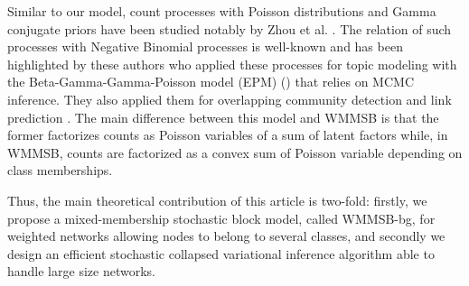 Similar to our model, count processes with Poisson distributions and Gamma conjugate priors have been studied notably by Zhou et al. \cite{zhou2012augment, zhou2015negative}. The relation of such processes with Negative Binomial processes is well-known and has been highlighted by these authors who applied  these processes for topic modeling with the Beta-Gamma-Gamma-Poisson model (EPM) (\cite{zhou2012beta}) that relies on MCMC inference. They also applied them for  overlapping community detection and link prediction \cite{zhou2015}. The main difference between this model and WMMSB is that the former factorizes counts as Poisson variables of a sum of latent factors while, in WMMSB, counts are factorized as a convex sum of Poisson variable depending on class memberships.

Thus, the main theoretical contribution of this article is two-fold: firstly, we propose a mixed-membership stochastic block model, called WMMSB-bg, for weighted networks allowing nodes to belong to several classes, and secondly we design an efficient stochastic collapsed variational inference algorithm able to handle large size networks.

%
%
%
%
%
%
%

